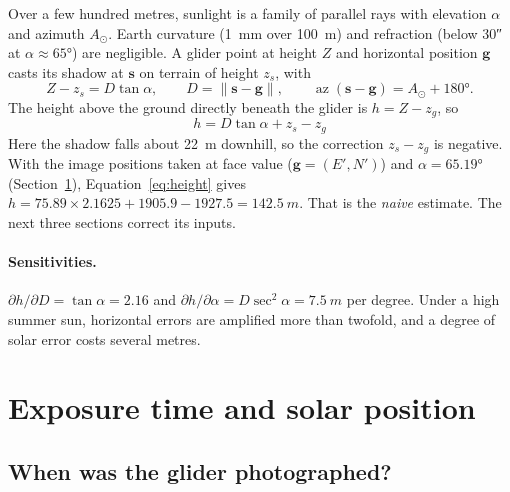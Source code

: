 \documentclass[11pt,a4paper]{article}
\begin{document}
Over a few hundred metres, sunlight is a family of parallel rays with elevation $\alpha$ and
azimuth $A_\odot$. Earth curvature (\SI{1}{mm} over \SI{100}{m}) and refraction (below \ang{;;30}
at $\alpha\approx\ang{65}$) are negligible. A glider point at height $Z$ and horizontal position
$\mathbf g$ casts its shadow at $\mathbf s$ on terrain of height $z_s$, with
\begin{equation}
  Z - z_s = D\tan\alpha,\qquad D = \lVert\mathbf s-\mathbf g\rVert,\qquad
  \operatorname{az}(\mathbf s-\mathbf g) = A_\odot + \ang{180}.
  \label{eq:ray}
\end{equation}
The height above the ground directly beneath the glider is $h = Z - z_g$, so
\begin{equation}
  \boxed{\,h = D\tan\alpha + z_s - z_g\,}
  \label{eq:height}
\end{equation}
Here the shadow falls about \SI{22}{m} downhill, so the correction $z_s-z_g$ is negative.
With the image positions taken at face value ($\mathbf g = (E',N')$) and $\alpha=\ang{65.19}$
(Section~\ref{sec:sun}), Equation~\eqref{eq:height} gives
$h = 75.89\times2.1625 + 1905.9 - 1927.5 = \SI{142.5}{m}$.
That is the \emph{naive} estimate. The next three sections correct its inputs.

\paragraph{Sensitivities.} $\partial h/\partial D = \tan\alpha = 2.16$ and
$\partial h/\partial\alpha = D\sec^2\alpha = \SI{7.5}{m}$ per degree.
Under a high summer sun, horizontal errors are amplified more than twofold, and a degree of solar error costs
several metres.

\section{Exposure time and solar position}\label{sec:sun}

\subsection{When was the glider photographed?}
\end{document}
